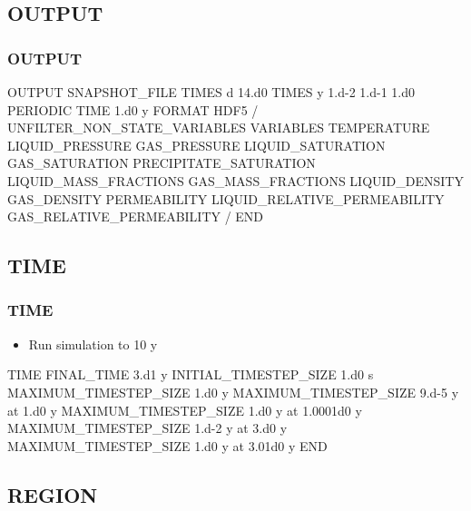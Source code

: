 \documentclass{beamer}
\begin{document}
\subsection{OUTPUT}

\begin{frame}\frametitle{OUTPUT}

\begin{semiverbatim}

OUTPUT
  SNAPSHOT_FILE
    TIMES d 14.d0
    TIMES y 1.d-2 1.d-1 1.d0
    PERIODIC TIME 1.d0 y
    FORMAT HDF5
  /
  UNFILTER_NON_STATE_VARIABLES
\newpage
   VARIABLES
   TEMPERATURE
   LIQUID_PRESSURE
   GAS_PRESSURE
   LIQUID_SATURATION
   GAS_SATURATION
   PRECIPITATE_SATURATION
   LIQUID_MASS_FRACTIONS
   GAS_MASS_FRACTIONS
   LIQUID_DENSITY
   GAS_DENSITY
   PERMEABILITY
   LIQUID_RELATIVE_PERMEABILITY
   GAS_RELATIVE_PERMEABILITY
  /
END
\end{semiverbatim}

\end{frame}

\subsection{TIME}

\begin{frame}[fragile]\frametitle{TIME}

\begin{itemize}
\item Run simulation to 10 y
\end{itemize}

\begin{semiverbatim}

TIME
  FINAL_TIME 3.d1 y
  INITIAL_TIMESTEP_SIZE 1.d0 s
  MAXIMUM_TIMESTEP_SIZE 1.d0 y
  MAXIMUM_TIMESTEP_SIZE 9.d-5 y at 1.d0 y
  MAXIMUM_TIMESTEP_SIZE 1.d0 y at 1.0001d0 y
  MAXIMUM_TIMESTEP_SIZE 1.d-2 y at 3.d0 y
  MAXIMUM_TIMESTEP_SIZE 1.d0 y at 3.01d0 y
END

\end{semiverbatim}

\end{frame}

\subsection{REGION}
\end{document}
